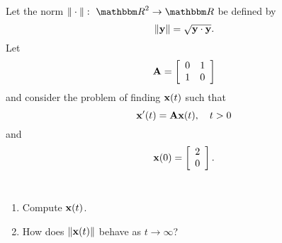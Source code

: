 
Let the norm $\norm{\cdot}:\mbox{ }\R^2\rightarrow\R$ be defined by
\[
\|{\bf y}\| = \sqrt{{\bf y}\cdot {\bf y}}.
\]
Let
\[
{\bf A} = \left[\begin{array}{cc}0 & 1 \\ 1 &  0\end{array}\right]
\]
and consider the problem of finding ${\bf x}(t)$ such that
\[
{\bf x}'(t) = {\bf A}{\bf x}(t),\quad t>0
\]
and
\[
{\bf x}(0) = \left[\begin{array}{c}2 \\ 0\end{array}\right].
\]
\\
\begin{enumerate}
\item Compute ${\bf x}(t)$.
\\
\item How does $\|{\bf x}(t)\|$ behave as $t\to\infty$?
\end{enumerate}




